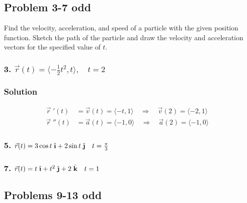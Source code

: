 \documentclass{article}
\newcommand{\ihat}{\;\hat{\textbf{\i}}}
\newcommand{\jhat}{\;\hat{\textbf{\j}}}
\newcommand{\khat}{\;\hat{\textbf{k}}}
\newcommand{\rvec}{\vec{r}(t)}
\newcommand{\drvec}{\vec{r}\;'(t)}
\begin{document}
\subsection*{Problem 3-7 odd}

Find the velocity, acceleration, and speed of a particle with the given position function. Sketch the path of the particle and draw the velocity and acceleration vectors for the specified value of $t$.

\subsubsection*{3. $\rvec = \langle -\frac 1 2 t^2, t \rangle, \quad t = 2$}
\subsubsection*{Solution}
\begin{align*}
    \drvec &= \vec v (t) = \langle -t, 1 \rangle \quad \Rightarrow \quad \vec v (2) = \langle -2, 1 \rangle \\
    \vec r \;''(t) &= \vec a (t) = \langle -1, 0 \rangle \quad\Rightarrow \quad \vec a (2) = \langle -1, 0\rangle 
\end{align*}

\subsubsection*{5. $\rvec = 3 \cos t \ihat + 2 \sin t \jhat \quad t = \frac \pi 3 $}
\subsubsection*{7. $\rvec = t\ihat + t^2\jhat + 2\khat \quad t = 1$}
\subsection*{Problems 9-13 odd}
        
\end{document}
